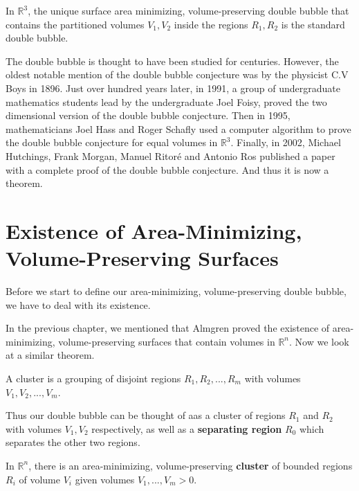 \documentclass[a4paper,12pt]{report}
\begin{document}
\begin{theorem}
In $\mathbb{R}^{3}$, the unique surface area minimizing, volume-preserving double bubble that contains the partitioned volumes $V_{1},V_{2}$ inside the regions $R_{1},R_{2}$ is the standard double bubble.
\end{theorem}

The double bubble is thought to have been studied for centuries. However, the oldest notable mention of the double bubble conjecture was by the physicist C.V Boys in 1896. Just over hundred years later, in 1991, a group of undergraduate mathematics students lead by the undergraduate Joel Foisy, proved the two dimensional version of the double bubble conjecture. Then in 1995, mathematicians Joel Hass and Roger Schafly used a computer algorithm to prove the double bubble conjecture for equal volumes in $\mathbb{R}^{3}$. Finally, in 2002, Michael Hutchings, Frank Morgan, Manuel Ritor\'e and Antonio Ros published a paper with a complete proof of the double bubble conjecture. And thus it is now a theorem.

\section{Existence of Area-Minimizing, Volume-Preserving Surfaces}

Before we start to define our area-minimizing, volume-preserving double bubble, we have to deal with its existence.

\hspace{-0.66cm}In the previous chapter, we mentioned that Almgren proved the existence of area-minimizing, volume-preserving surfaces that contain volumes in $\mathbb{R}^{n}$. Now we look at a similar theorem.

\begin{definition}
A cluster is a grouping of disjoint regions $R_{1}, R_{2}, ... , R_{m}$ with volumes $V_{1}, V_{2}, ... , V_{m}$.
\end{definition}

Thus our double bubble can be thought of aas a cluster of regions $R_{1}$ and $R_{2}$ with volumes $V_{1}, V_{2}$ respectively, as well as a \textbf{separating region} $R_{0}$ which separates the other two regions.

\begin{theorem}
In $\mathbb{R}^{n}$, there is an area-minimizing, volume-preserving \textbf{cluster} of bounded regions $R_{i}$ of volume $V_{i}$ given volumes $V_{1},..., V_{m}>0$.
\end{theorem}
\end{document}
